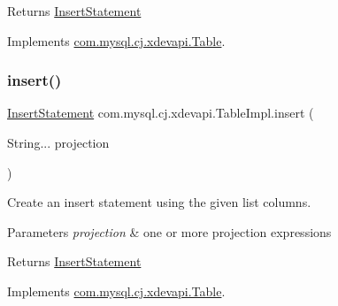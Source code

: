 \begin{DoxyReturn}{Returns}
\mbox{\hyperlink{interfacecom_1_1mysql_1_1cj_1_1xdevapi_1_1_insert_statement}{Insert\+Statement}} 
\end{DoxyReturn}


Implements \mbox{\hyperlink{interfacecom_1_1mysql_1_1cj_1_1xdevapi_1_1_table_ae9faedd85539146509fa68982fc346f9}{com.\+mysql.\+cj.\+xdevapi.\+Table}}.

\mbox{\label{classcom_1_1mysql_1_1cj_1_1xdevapi_1_1_table_impl_a6ead605c582f7e5d5e95c0704a17686a}} 
\subsubsection{\texorpdfstring{insert()}{insert()}\hspace{0.1cm}{\footnotesize\ttfamily [2/3]}}
{\footnotesize\ttfamily \mbox{\hyperlink{interfacecom_1_1mysql_1_1cj_1_1xdevapi_1_1_insert_statement}{Insert\+Statement}} com.\+mysql.\+cj.\+xdevapi.\+Table\+Impl.\+insert (\begin{DoxyParamCaption}\item[{String...}]{projection }\end{DoxyParamCaption})}

Create an insert statement using the given list columns.


\begin{DoxyParams}{Parameters}
{\em projection} & one or more projection expressions \\
\hline
\end{DoxyParams}
\begin{DoxyReturn}{Returns}
\mbox{\hyperlink{interfacecom_1_1mysql_1_1cj_1_1xdevapi_1_1_insert_statement}{Insert\+Statement}} 
\end{DoxyReturn}


Implements \mbox{\hyperlink{interfacecom_1_1mysql_1_1cj_1_1xdevapi_1_1_table_a67eccc4ea9487430c524001bdd912180}{com.\+mysql.\+cj.\+xdevapi.\+Table}}.

\mbox{\label{classcom_1_1mysql_1_1cj_1_1xdevapi_1_1_table_impl_acc6cac6129c86ac4ec2a7ce02303b4bb}} 
